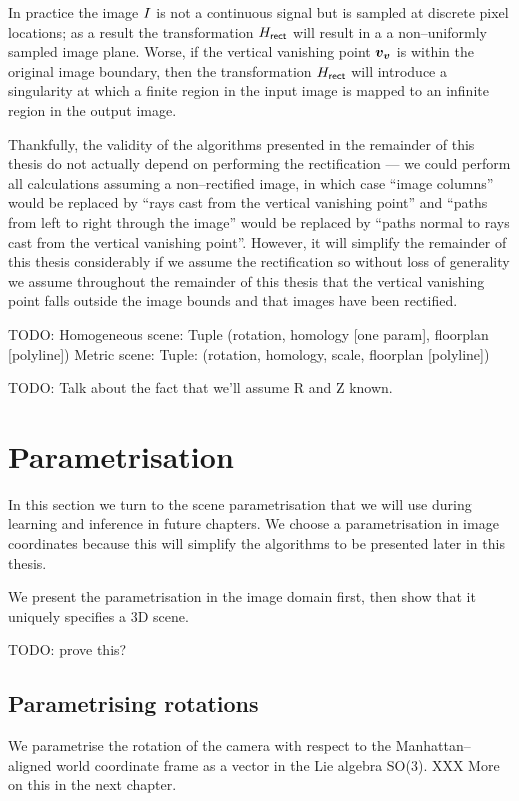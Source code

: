 In practice the image $\Image$ is not a continuous signal but is
sampled at discrete pixel locations; as a result the transformation
$\Rectifier$ will result in a a non--uniformly sampled image
plane. Worse, if the vertical vanishing point $\vvpt$ is within the
original image boundary, then the transformation $\Rectifier$ will
introduce a singularity at which a finite region in the input image is
mapped to an infinite region in the output image.

Thankfully, the validity of the algorithms presented in the remainder
of this thesis do not actually depend on performing the rectification
 --- we could perform all calculations assuming
a non--rectified image, in which case ``image columns'' would be
replaced by ``rays cast from the vertical vanishing point'' and
``paths from left to right through the image'' would be replaced by
``paths normal to rays cast from the vertical vanishing
point''. However, it will simplify the remainder of this thesis
considerably if we assume the rectification  so
without loss of generality we assume throughout the remainder of this
thesis that the vertical vanishing point falls outside the image
bounds and that images have been rectified.

TODO:
Homogeneous scene: Tuple (rotation, homology [one param], floorplan [polyline])
Metric scene: Tuple: (rotation, homology, scale, floorplan [polyline])

TODO: Talk about the fact that we'll assume R and Z known.

\section{Parametrisation}

In this section we turn to the scene parametrisation that we will use
during learning and inference in future chapters. We choose a
parametrisation in image coordinates because this will simplify the
algorithms to be presented later in this thesis.

We present the parametrisation in the image domain first, then show
that it uniquely specifies a 3D scene.


TODO: prove this?

\subsection{Parametrising rotations}

We parametrise the rotation of the camera with respect to the
Manhattan--aligned world coordinate frame as a vector in the Lie
algebra SO(3). XXX More on this in the next chapter.

